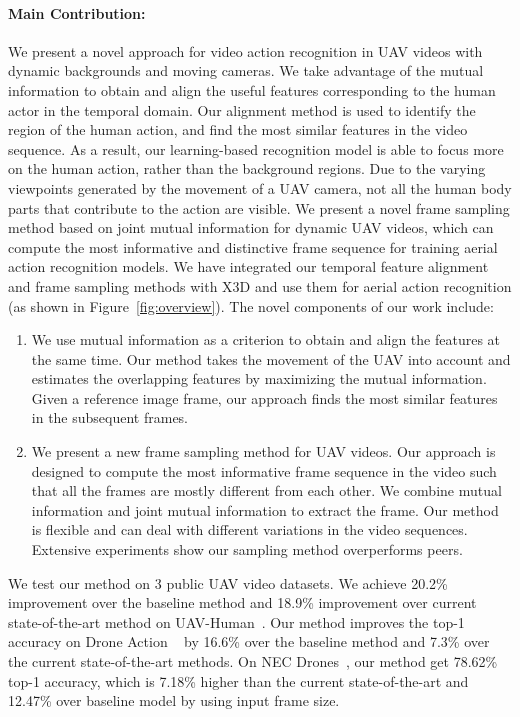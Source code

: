 \documentclass[10pt,twocolumn,letterpaper]{article}
\begin{document}
\paragraph{Main Contribution:}
We present a novel approach for video action recognition in UAV videos with dynamic backgrounds and moving cameras. 
We take advantage of the mutual information to obtain and align the useful features corresponding to the human actor in the temporal domain. Our alignment method is used to identify the region of the human action, and find the most similar features in the video sequence. As a result, our learning-based recognition model is able to focus more on the human action, rather than the background  regions. Due to the varying viewpoints generated by the movement of a UAV camera, not all the human body parts that contribute to the action are visible.  We present a  novel frame sampling method based on joint mutual information  for dynamic UAV videos, which can compute the most informative and distinctive frame sequence for training aerial action recognition models. We have integrated our temporal feature alignment and frame sampling methods with X3D\cite{feichtenhofer2020x3d} and use them for aerial action recognition (as shown in Figure~\ref{fig:overview}). The novel components of our work include: 
\begin{enumerate}
    \item We use mutual information as a criterion to obtain and align the features at the same time. Our method takes the movement of the UAV into account and estimates the overlapping features by maximizing the mutual information. Given a reference image frame, our approach finds the most similar features in the subsequent frames.
\item We present a new frame sampling method for UAV videos. Our approach is designed to compute the most informative frame sequence in the video such that all the frames are mostly different from each other. We combine mutual information and joint mutual information to extract the frame.
Our method is flexible and can deal with different variations in the video sequences. Extensive experiments show our sampling method overperforms peers.   \end{enumerate}
We test our method on 3 public UAV video datasets. We achieve 20.2\% improvement over the baseline method and  18.9\% improvement over current state-of-the-art method on UAV-Human~\cite{li2021uav}. Our method improves the top-1 accuracy on Drone Action ~\cite{perera2019drone} by 16.6\% over the baseline method and 7.3\% over the current state-of-the-art methods. On NEC Drones~\cite{choi2020unsupervised}, our method get 78.62\% top-1 accuracy, which is 7.18\% higher than the current state-of-the-art and 12.47\% over baseline model by using  input frame size. 
\label{sec:intro}
\end{document}
